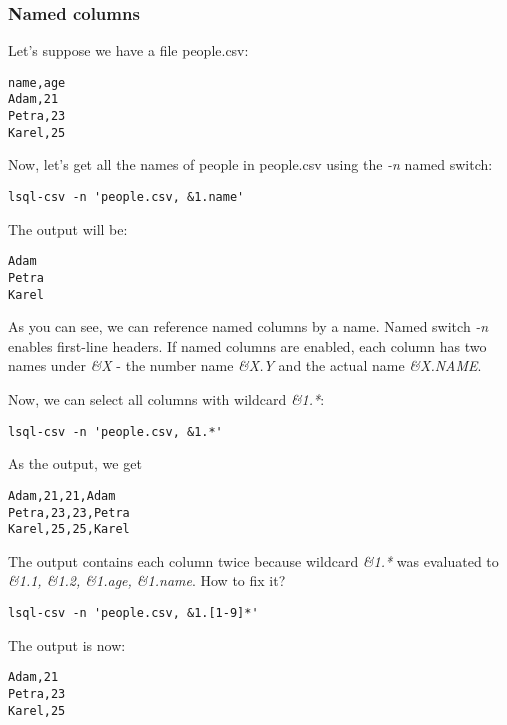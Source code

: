 \subsubsection{Named columns}
Let's suppose we have a file people.csv:
\begin{verbatim}
name,age                                                                                                                                                                                                                                   
Adam,21                                                                                                                                                                                                                                    
Petra,23                                                                                                                                                                                                                                   
Karel,25
\end{verbatim}

Now, let's get all the names of people in people.csv using the \textit{-n} named switch:
\begin{verbatim}
lsql-csv -n 'people.csv, &1.name'
\end{verbatim}
The output will be:
\begin{verbatim}
Adam
Petra
Karel
\end{verbatim}

As you can see, we can reference named columns by a name. Named switch \textit{-n} enables first-line headers.
If named columns are enabled, each column has two names under \textit{\&X} - the number name \textit{\&X.Y} and the actual name \textit{\&X.NAME}.

Now, we can select all columns with wildcard \textit{\&1.*}:
\begin{verbatim}
lsql-csv -n 'people.csv, &1.*'
\end{verbatim}
As the output, we get
\begin{verbatim}
Adam,21,21,Adam
Petra,23,23,Petra
Karel,25,25,Karel
\end{verbatim}

The output contains each column twice because wildcard \textit{\&1.*} was evaluated to \textit{\&1.1, \&1.2, \&1.age, \&1.name}.
How to fix it?
\begin{verbatim}
lsql-csv -n 'people.csv, &1.[1-9]*'
\end{verbatim}
The output is now:
\begin{verbatim}
Adam,21
Petra,23
Karel,25
\end{verbatim}

